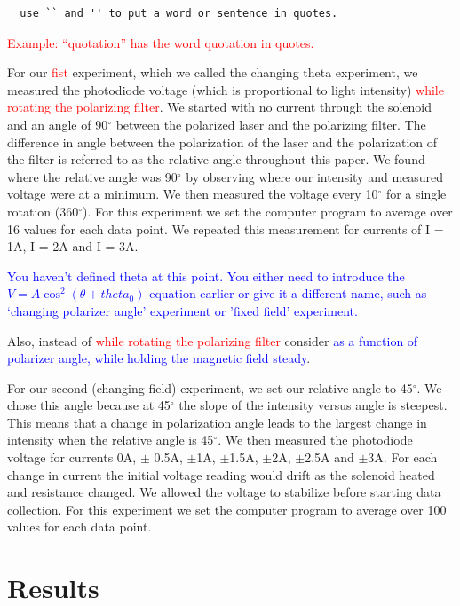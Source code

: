 \documentclass[prb,preprint]{revtex4-1}
\begin{document}
\begin{verbatim}
  use `` and '' to put a word or sentence in quotes. 
\end{verbatim}
\textcolor{red}{Example: ``quotation'' has the word quotation in quotes. }


For our \textcolor{red}{fist} experiment, which we called the changing theta experiment, we measured the photodiode voltage (which is proportional to light intensity) \textcolor{red}{while rotating the polarizing filter}. We started with no current through the solenoid and an angle of 90$^{\circ}$ between the polarized laser and the polarizing filter. The difference in angle between the polarization of the laser and the polarization of the filter is referred to as the relative angle throughout this paper. We found where the relative angle was 90$^{\circ}$ by observing where our intensity and measured voltage were at a minimum. We then measured the voltage every 10$^{\circ}$ for a single rotation (360$^{\circ}$). For this experiment we set the computer program to average over 16 values for each data point. We repeated this measurement for currents of I = 1A, I = 2A and I = 3A. 

\textcolor{blue}{You haven't defined theta at this point. You either need to introduce the $V = A \cos^{2} (\theta + theta_0)$ equation earlier or give it a different name, such as `changing polarizer angle' experiment or 'fixed field' experiment. }

Also, instead of \textcolor{red}{while rotating the polarizing filter} consider \textcolor{blue}{as a function of polarizer angle, while holding the magnetic field steady}.

For our second (changing field) experiment, we set our relative angle to 45$^{\circ}$. We chose this angle because at 45$^{\circ}$ the slope of the intensity versus angle is steepest. This means that a change in polarization angle leads to the largest change in intensity when the relative angle is 45$^{\circ}$. We then measured the photodiode voltage for currents 0A, $\pm$ 0.5A, $\pm$1A, $\pm$1.5A, $\pm$2A, $\pm$2.5A and $\pm$3A. For each change in current the initial voltage reading would drift as the solenoid heated and resistance changed. We allowed the voltage to stabilize before starting data collection. For this experiment we set the computer program to average over 100 values for each data point.


\section{Results}
\end{document}
